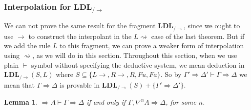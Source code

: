 \documentclass[12pt,a4paper]{article}
\theoremstyle{plain}
\newtheorem{lem}[thm]{Lemma}
\theoremstyle{definition}
\begin{document}
\subsubsection{Interpolation for $\mathbf{LDL}_{/\rightarrow}$}
We can not prove the same result for the fragment $\mathbf{LDL}_{/\rightarrow}$, since we ought to use $\rightarrow$ to construct the interpolant in the  $L\rightsquigarrow$ case of the last theorem. But if we add the rule $L$ to this fragment, we can prove a weaker form of interpolation using $\rightsquigarrow$, as we will do in this section.
Throughout this section, when we use plain $\vdash$ symbol without specifying the deductive system, we mean deduction in $\mathbf{LDL}_{/\rightarrow}(S, L)$ where $S \subseteq \{L\rightarrow, R\rightarrow, R, Fu, Fa\}$. So by $\Gamma' \Rightarrow \Delta' \vdash \Gamma \Rightarrow \Delta$ we mean that $\Gamma \Rightarrow \Delta$ is provable in $\mathbf{LDL}_{/\rightarrow}(S)+\{\Gamma' \Rightarrow \Delta'\}$.
\begin{lem}
	\label{lem:vdash} $\Rightarrow A \vdash \Gamma \Rightarrow \Delta$ if and only if $\Gamma, \nabla^n A \Rightarrow \Delta$, for some $n$.
\end{lem}
\end{document}
